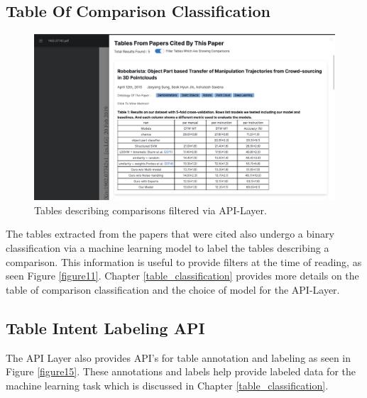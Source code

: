 \subsection{Table Of Comparison Classification}
\begin{figure}[h]
    \centering
    \includegraphics[width=\maxwidth{\textwidth}]{src/images/classification_exp.png}
    \caption{Tables describing comparisons filtered via API-Layer. }
    \label{figure\arabic{figurecounter}}
\end{figure}

The tables extracted from the papers that were cited also undergo a binary classification via a machine learning model to label the tables describing a comparison. This information is useful to provide filters at the time of reading, as seen Figure \ref{figure11}. Chapter \ref{table_classification} provides more details on the table of comparison classification and the choice of model for the API-Layer.
 
\subsection{Table Intent Labeling API}
The API Layer also provides API's for table annotation and labeling as seen in Figure \ref{figure15}. These annotations and labels help provide labeled data for the machine learning task which is discussed in Chapter \ref{table_classification}.

